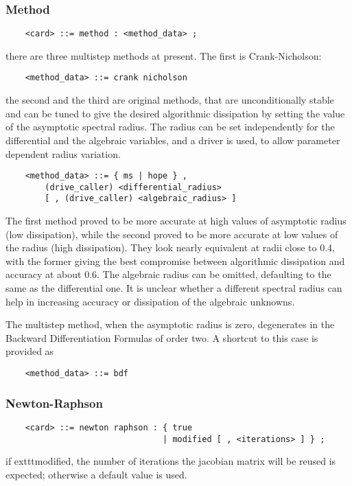 \subsubsection{Method}
\begin{verbatim}
    <card> ::= method : <method_data> ;
\end{verbatim}
there are three multistep methods at present. 
The first is Crank-Nicholson:
\begin{verbatim}
    <method_data> ::= crank nicholson
\end{verbatim}
the second and the third are original methods, that are unconditionally
stable and can be tuned to give the desired algorithmic dissipation
by setting the value of the asymptotic spectral radius.
The radius can be set independently for the differential
and the algebraic variables, and a driver is used, to allow parameter 
dependent radius variation.
\begin{verbatim}
    <method_data> ::= { ms | hope } ,
        (drive_caller) <differential_radius>
        [ , (drive_caller) <algebraic_radius> ]
\end{verbatim}
The first method proved to be more accurate at high values of asymptotic
radius (low dissipation), while the second proved to be more accurate
at low values of the radius (high dissipation).
They look nearly equivalent at radii close to 0.4, with the former
giving the best compromise between algorithmic dissipation and accuracy 
at about 0.6.
The algebraic radius can be omitted, defaulting to the same 
as the differential one.
It is unclear whether a different spectral radius can help in increasing
accuracy or dissipation of the algebraic unknowns.

\noindent
The multistep method, when the asymptotic radius is zero, degenerates
in the Backward Differentiation Formulas of order two.
A shortcut to this case is provided as
\begin{verbatim}
    <method_data> ::= bdf
\end{verbatim}


\subsubsection{Newton-Raphson}
\begin{verbatim}
    <card> ::= newton raphson : { true 
                                | modified [ , <iterations> ] } ;
\end{verbatim}
if 	exttt{modified}, the number of iterations the jacobian matrix will be
reused is expected; otherwise a default value is used.

